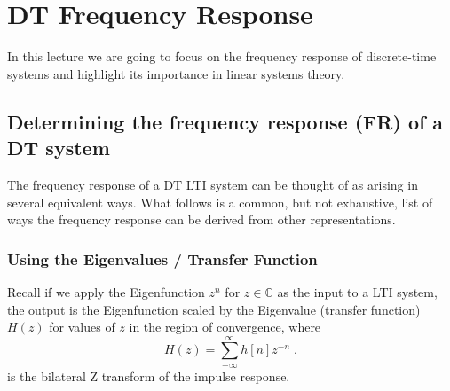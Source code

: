 \chapter{DT Frequency Response}

In this lecture we are going to focus on the frequency response of discrete-time systems and highlight its importance in linear systems theory.

\section{Determining the frequency response (FR) of a DT system}

The frequency response of a DT LTI system can be thought of as arising in several equivalent ways. What follows is a common, but not exhaustive, list of ways the frequency response can be derived from other representations.

\subsection*{Using the Eigenvalues / Transfer Function}

Recall if we apply the Eigenfunction $z^{n}$ for $z \in \mathbb{C}$ as the input to a LTI system, the output is the Eigenfunction scaled by the Eigenvalue (transfer function) $H(z)$ for values of $z$ in the region of convergence, where
\[
H(z) = \sum\limits_{-\infty}^{\infty} h[n] z^{-n}\; .
\]
is the bilateral Z transform of the impulse response.

